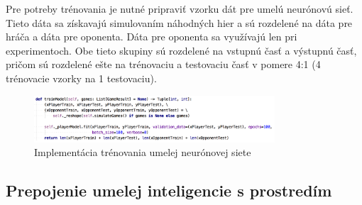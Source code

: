 Pre potreby trénovania je nutné pripraviť vzorku dát pre umelú neurónovú sieť.
Tieto dáta sa získavajú simulovaním náhodných hier a sú rozdelené na dáta pre hráča a dáta pre oponenta.
Dáta pre oponenta sa využívajú len pri experimentoch.
Obe tieto skupiny sú rozdelené na vstupnú časť a výstupnú časť, pričom sú rozdelené ešte na trénovaciu a testovaciu časť
v pomere 4:1 (4 trénovacie vzorky na 1 testovaciu).

\begin{figure}[H]
    \centering
    \includegraphics[width=0.8\textwidth]{images/impl-ann-train.jpg}
    \caption{Implementácia trénovania umelej neurónovej siete}
\end{figure}\label{figure:ann-train-impl}

\subsection{Prepojenie umelej inteligencie s prostredím}\label{subsec:connection}


